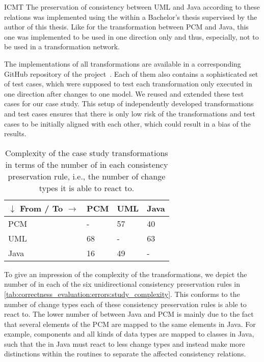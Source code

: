 \begin{copiedFrom}{ICMT}
The preservation of consistency between \gls{UML} and Java according to these relations was implemented using the \reactionslanguage within a Bachelor's thesis supervised by the author of this thesis.
Like for the transformation between \gls{PCM} and Java, this one was implemented to be used in one direction only and thus, especially, not to be used in a transformation network.

The implementations of all transformations are available in a corresponding GitHub repository of the \vitruv project~\cite{vitruvCBSEGithub}.
Each of them also contains a sophisticated set of test cases, which were supposed to test each transformation only executed in one direction after changes to one model.
We reused and extended these test cases for our case study.
This setup of independently developed transformations and test cases ensures that there is only low risk of the transformations and test cases to be initially aligned with each other, which could result in a bias of the results.

\begin{table}
    \centering
    \small
    \renewcommand{\arraystretch}{1.4}
    \begin{tabular}{L{7em}C{4em}C{4em}C{4em}}
        \toprule
        \textbf{$\downarrow$ From} / \textbf{To $\rightarrow$}& \gls{PCM} & \gls{UML} & Java \\
        \midrule
        \gls{PCM} & -   & 57    & 40 \\
        \gls{UML} & 68  & -     & 63 \\
        Java      & 16  & 49    & -  \\
        \bottomrule
    \end{tabular}
    \caption[Complexity of case study transformations]{Complexity of the case study transformations in terms of the number of \reactions in each consistency preservation rule, i.e., the number of change types it is able to react to.}
    \label{tab:correctness_evaluation:errors:study_complexity}
\end{table}

To give an impression of the complexity of the transformations, we depict the number of \reactions in each of the six unidirectional consistency preservation rules in \autoref{tab:correctness_evaluation:errors:study_complexity}.
This conforms to the number of change types each of these consistency preservation rules is able to react to.
The lower number of \reactions between Java and \gls{PCM} is mainly due to the fact that several elements of the \gls{PCM} are mapped to the same elements in Java.
For example, components and all kinds of data types are mapped to classes in Java, such that the \reactions in Java must react to less change types and instead make more distinctions within the routines to separate the affected consistency relations.


\end{copiedFrom}
